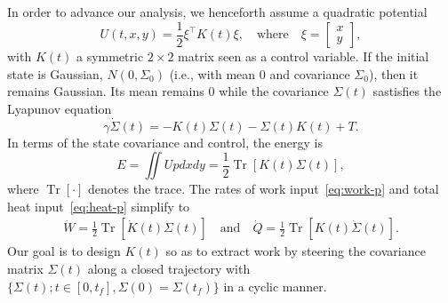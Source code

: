 \documentclass[
 reprint,
superscriptaddress,
 amsmath,amssymb,prl
 aps
]{revtex4-2}
\newcommand{\op}[1]{\operatorname{#1}}
\newcommand{\trace}{\op{Tr}}
\begin{document}
In order to advance our analysis,
we henceforth assume a quadratic potential
\begin{equation*}
    U(t,x,y)=\frac{1}{2} \xi^\top K(t)\xi, \quad \mbox{where}\quad \xi=\left[\begin{array}{c}x\\ y\end{array}\right],
\end{equation*}
with $K(t)$ a symmetric $2\times 2$ matrix seen as a control variable. If the initial state is Gaussian, $N(0,\Sigma_0)$ (i.e., with mean $0$ and covariance $\Sigma_0$), then it remains Gaussian. Its mean remains $0$ while the
covariance $\Sigma(t)$ sastisfies the Lyapunov equation
\begin{equation}\label{eq:Lyapunov}
    \gamma \dot\Sigma(t)=-K(t)\Sigma(t)-\Sigma(t) K(t)+T.
\end{equation}
In terms of the state covariance and control, the energy is 
\[
E = \iint Updxdy=\frac{1}{2}\trace[K(t)\Sigma(t)],
\]
where $\trace [ \cdot ]$ denotes the trace. The rates of work input~\eqref{eq:work-p} and total heat input~\eqref{eq:heat-p} simplify to 
\begin{align*}
      \dot  W = \frac{1}{2}\trace[ \dot{K}(t) \Sigma(t)]\quad\mbox{and}\quad 
      \dot Q = \frac{1}{2}\trace[ {K}(t) \dot{\Sigma}(t)]. 
\end{align*}
Our goal is to design $K(t)$ so as to extract work by steering the covariance matrix $\Sigma(t)$ along a closed trajectory with $\{\Sigma(t);t\in[0,t_f],\Sigma(0)=\Sigma(t_f)\}$ in a cyclic manner.
\end{document}
